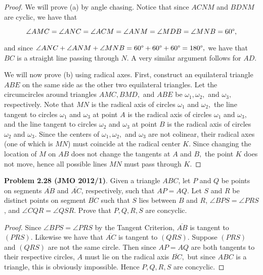 \documentclass[letterpaper,oneside]{book}
\begin{document}
  \begin{proof}  We will prove (a) by angle chasing. Notice that since $ACNM$ and $BDNM$ are cyclic, we have that

$$\angle AMC = \angle ANC = \angle ACM = \angle ANM = \angle MDB = \angle MNB = 60\degree,$$

and since $\angle ANC + \angle ANM + \angle MNB = 60\degree + 60\degree + 60\degree = 180\degree,$ we have that $BC$ is a straight line passing through $N.$ A very similar argument follows for $AD.$

We will now prove (b) using radical axes. First, construct an equilateral triangle $ABE$ on the same side as the other two equilateral triangles. Let the circumcircles around triangles $AMC, BMD,$ and $ABE$ be $\omega_1, \omega_2,$ and $\omega_3,$ respectively. Note that $MN$ is the radical axis of circles $\omega_1$ and $\omega_2,$ the line tangent to circles $\omega_1$ and $\omega_3$ at point $A$ is the radical axis of circles $\omega_1$ and $\omega_3,$ and the line tangent to circles $\omega_2$ and $\omega_3$ at point $B$ is the radical axis of circles $\omega_2$ and $\omega_3.$ Since the centers of  $\omega_1, \omega_2,$ and $\omega_3$ are not colinear, their radical axes (one of which is $MN$) must coincide at the radical center $K.$ Since changing the location of $M$ on $AB$ does not change the tangents at $A$ and $B,$ the point $K$ does not move, hence all possible lines $MN$ must pass through $K.$ \end{proof}

  

  \textbf{Problem 2.28 (JMO 2012/1)}.   Given a triangle $ABC$, let $P$ and $Q$ be points on segments $\overline{AB}$ and $\overline{AC}$, respectively, such that $AP = AQ.$ Let $S$ and $R$ be distinct points on segment $\overline{BC}$ such that $S$ lies between $B$ and $R$, $\angle BPS = \angle PRS$, and $\angle CQR = \angle QSR$. Prove that $P, Q, R, S$ are concyclic.

  \begin{proof}  Since $\angle BPS = \angle PRS$ by the Tangent Criterion, $\overline{AB}$ is tangent to $(PRS).$ Likewise we have that $\overline{AC}$ is tangent to $(QRS).$ Suppose $(PRS)$ and $(QRS)$ are not the same circle. Then since $AP=AQ$ are both tangents to their respective circles, $A$ must lie on the radical axis $\overline{BC},$ but since $ABC$ is a triangle, this is obviously impossible. Hence $P,Q,R,S$ are concyclic. \end{proof}
\end{document}
